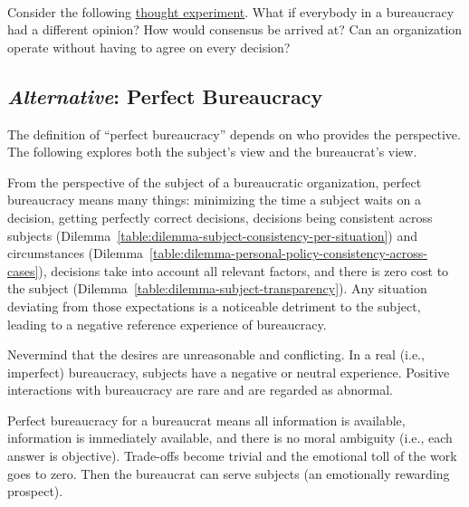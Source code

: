 \ \\

Consider the following 
\href{https://en.wikipedia.org/wiki/Thought_experiment}{thought experiment}. 
\iftoggle{WPinmargin}{\marginpar{$>$Wikipedia: thought experiment}}{}
What if everybody in a bureaucracy had a different opinion? How would consensus be arrived at? 
Can an organization operate without having to agree on every decision? 



\subsection*{\textit{Alternative}: Perfect Bureaucracy}

The definition of ``perfect bureaucracy'' depends on who provides the perspective. The following explores both the subject's view and the bureaucrat's view. 

From the perspective of the subject of a bureaucratic organization, perfect bureaucracy means many things: minimizing the time a subject waits on a decision, getting perfectly correct decisions, decisions being consistent across subjects (Dilemma~\ref{table:dilemma-subject-consistency-per-situation})
%
and circumstances (Dilemma~\ref{table:dilemma-personal-policy-consistency-across-cases}), decisions take into account all relevant factors, and there is zero cost to the subject (Dilemma~\ref{table:dilemma-subject-transparency}). 
%
Any situation deviating from those expectations is a noticeable detriment to the subject, leading to a negative reference experience of bureaucracy. 

Nevermind that the desires are unreasonable and conflicting. In a real (i.e., imperfect) bureaucracy, subjects have a negative or neutral experience. Positive interactions with bureaucracy are rare and are regarded as abnormal.

Perfect bureaucracy for a bureaucrat means all information is available, information is immediately available, and there is no moral ambiguity (i.e., each answer is objective). Trade-offs become trivial and the emotional toll of the work goes to zero. Then the bureaucrat can serve subjects (an emotionally rewarding prospect). 

